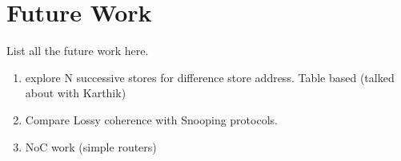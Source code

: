 \section{Future Work}

List all the future work here.

\begin{enumerate}
	\item explore N successive stores for difference store address. Table based (talked about with Karthik)
	\item Compare Lossy coherence with Snooping protocols.
	\item NoC work (simple routers)
\end{enumerate}